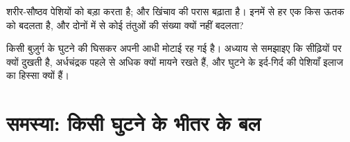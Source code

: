 \begin{exercise}[$\star\star\star$]\label{exo:g10:muscles-and-joints:14}
शरीर-सौष्ठव पेशियों को बड़ा करता है; और खिंचाव  की परास बढ़ाता है।
इनमें से हर एक किस ऊतक को बदलता है, और दोनों में से कोई तंतुओं की संख्या
क्यों नहीं बदलता?
\end{exercise}

\begin{exercise}[$\star\star\star$]\label{exo:g10:muscles-and-joints:15}
किसी बुज़ुर्ग के घुटने की  घिसकर अपनी आधी मोटाई रह गई है। अध्याय
से समझाइए कि सीढ़ियों पर  क्यों दुखती है, अर्धचंद्रक पहले से अधिक
क्यों मायने रखते हैं, और घुटने के इर्द-गिर्द की पेशियाँ इलाज का हिस्सा
क्यों हैं।
\end{exercise}

\section{समस्या: किसी घुटने के भीतर के बल}

